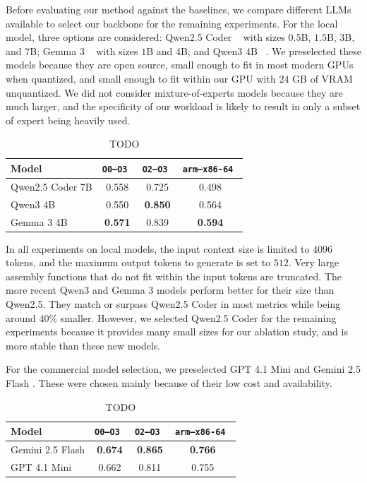Before evaluating our method against the baselines, we compare different LLMs available to select our backbone for the remaining experiments.
For the local model, three options are considered: Qwen2.5 Coder ~\cite{qwen2} with sizes \(0.5\)B, \(1.5\)B, \(3\)B, and \(7\)B;
Gemma 3 ~\cite{gemma3} with sizes \(1\)B and \(4\)B; and  Qwen3 \(4\)B ~\cite{qwen3}. We preselected these models because they are open source,
small enough to fit in most modern GPUs when quantized, and small enough to fit within our GPU with
\(24\) GB of VRAM unquantized. We did not consider mixture-of-experts models because they are much larger, and the specificity of our
workload is likely to result in only a subset of expert being heavily used.
{
    \renewcommand{\arraystretch}{1.1}
    \begin{table}[h]
    \centering
    \begin{tabular}{|l|ccc|} \hline
    Model            & \tt O0--O3 & \tt O2--O3 & \tt arm--x86-64 \\ \hline
    Qwen2.5 Coder 7B & 0.558      & 0.725      & 0.498            \\
    Qwen3 4B         & 0.550      & \bf 0.850  & 0.564            \\
    Gemma 3 4B       & \bf 0.571  & 0.839      & \bf 0.594        \\ \hline
    \end{tabular}
    \caption{TODO}
    \end{table}
}

In all experiments on local models, the input context size is limited to \(4096\) tokens, and the maximum output tokens to generate is set to \(512\).
Very large assembly functions that do not fit within the input tokens are truncated. The more recent Qwen3 and Gemma 3
models perform better for their size than Qwen2.5. They match or surpass Qwen2.5 Coder in most metrics while being around \(40\%\)
smaller. However, we selected Qwen2.5 Coder for the remaining experiments because it provides many small sizes for our ablation study,
and is more stable than these new models.

For the commercial model selection, we preselected GPT 4.1 Mini \cite{gpt4} and Gemini 2.5 Flash \cite{gemini2.5}.
These were chosen mainly because of their low cost and availability.
{
    \renewcommand{\arraystretch}{1.1}
    \begin{table}[h]
    \centering
    \begin{tabular}{|l|ccc|} \hline
    Model            & \tt O0--O3 & \tt O2--O3 & \tt arm--x86-64 \\ \hline
    Gemini 2.5 Flash & \bf 0.674  & \bf 0.865  & \bf 0.766        \\
    GPT 4.1 Mini     & 0.662      & 0.811      & 0.755            \\ \hline
    \end{tabular}
    \caption{TODO}
    \end{table}
}


